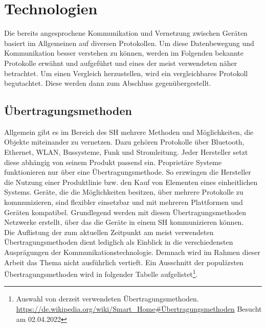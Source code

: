 \section{Technologien}
\label{sec:technologien}
    Die bereits angesprochene Kommunikation und Vernetzung zwischen Geräten basiert im Allgemeinen auf 
    diversen Protokollen. Um diese Datenbewegung und Kommunikation besser verstehen zu können, werden im 
    Folgenden bekannte Protokolle erwähnt und aufgeführt und eines der meist verwendeten näher betrachtet. 
    Um einen Vergleich herzustellen, wird ein vergleichbares Protokoll begutachtet. Diese werden dann zum 
    Abschluss gegenübergestellt. 

    \subsection{Übertragungsmethoden}
    \label{subsec:netzwerkprotokolle}
    Allgemein gibt es im Bereich des \acl{SH} mehrere Methoden und Möglichkeiten, die Objekte miteinander zu vernetzen. 
    Dazu gehören Protokolle über Bluetooth, Ethernet, WLAN, Bussysteme, Funk und Stromleitung. 
    Jeder Hersteller setzt diese abhängig von seinem Produkt passend ein. Proprietäre Systeme funktionieren nur über eine 
    Übertragungsmethode. So erzwingen die Hersteller die Nutzung einer Produktlinie bzw. den Kauf von Elementen eines 
    einheitlichen Systems. Geräte, die die Möglichkeiten besitzen, über mehrere Protokolle 
    zu kommunizieren, sind flexibler einsetzbar und mit mehreren Plattformen und Geräten kompatibel.
    Grundlegend werden mit diesen Übertragungsmethoden Netzwerke erstellt, über das die Geräte in einem \acl{SH} kommunizieren können.
    \\
    \linebreak    
    Die Auflistung der zum aktuellen Zeitpunkt am meist verwendeten Übertragungsmethoden dient 
    lediglich als Einblick in die verschiedensten Ausprägungen der Kommunikationstechnologie.   
    Demnach wird im Rahmen dieser Arbeit das Thema nicht ausführlich vertieft.
    Ein Ausschnitt der populärsten Übertragungsmethoden wird in folgender Tabelle aufgelistet\footnote{Auswahl von derzeit verwendeten Übertragungsmethoden. \url{https://de.wikipedia.org/wiki/Smart_Home\#Übertragungsmethoden} Besucht am 02.04.2022}. 

